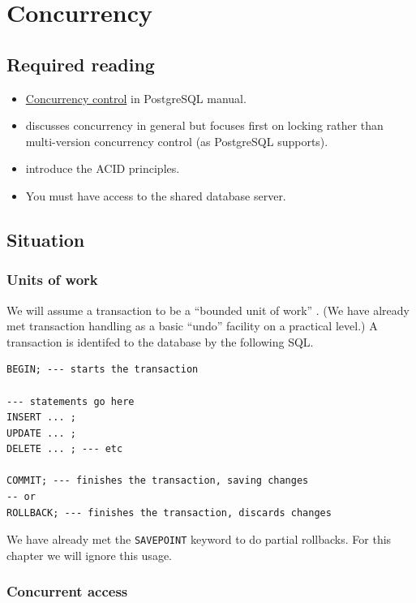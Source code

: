 \chapter{Concurrency}
\label{ch:concurrency}

\section*{Required reading}

\begin{itemize}
\item \href{https://www.postgresql.org/docs/13/mvcc.html}{Concurrency control} in PostgreSQL manual.
\item \citep[Chapter 22]{connolly:2015:database} discusses concurrency in general but focuses first on locking rather than multi-version concurrency control (as PostgreSQL supports).
\item \citep{haerder:1983:principles} introduce the ACID principles.
\item You must have access to the shared database server.
\end{itemize}

\section{Situation}

\subsection{Units of work}

We will assume a transaction to be a ``bounded unit of work'' \citep{fowler:2003:patterns}.
(We have already met transaction handling as a basic ``undo'' facility on a practical level.) 
A transaction is identifed to the database by the following SQL. 

\begin{verbatim}
BEGIN; --- starts the transaction

--- statements go here
INSERT ... ;
UPDATE ... ;
DELETE ... ; --- etc

COMMIT; --- finishes the transaction, saving changes
-- or
ROLLBACK; --- finishes the transaction, discards changes
\end{verbatim}

We have already met the \texttt{SAVEPOINT} keyword to do partial rollbacks.
For this chapter we will ignore this usage.

\subsection{Concurrent access}

